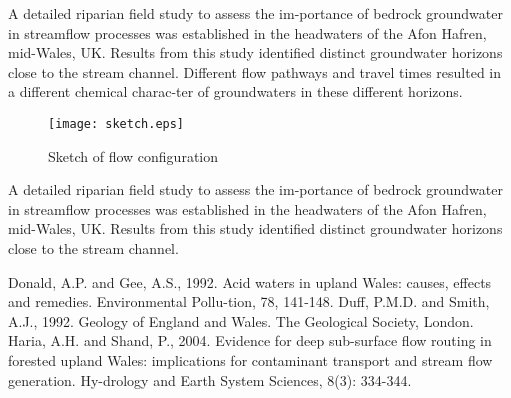 \documentclass[12pt,a4paper,twocolumn,fleqn]{narms}
\begin{document}
A detailed riparian field study to assess the im-portance of
bedrock groundwater in streamflow processes was established in the
headwaters of the Afon Hafren, mid-Wales, UK.  Results from this
study identified distinct groundwater horizons close to the stream
channel.  Different flow pathways and travel times resulted in a
different chemical charac-ter of groundwaters in these different
horizons.


\begin{figure}
\centerline{
\texttt{[image: sketch.eps]}
} \caption{Sketch of flow configuration} \label{f:sketch1}
\end{figure}


A detailed riparian field study to assess the im-portance of
bedrock groundwater in streamflow processes was established in the
headwaters of the Afon Hafren, mid-Wales, UK.  Results from this
study identified distinct groundwater horizons close to the stream
channel.

\begin{table}
\caption{Margin settings for A4 size paper and letter size paper.}
\end{table}


\begin{thebibliography}{9}
\bibitem{} Donald, A.P. and Gee, A.S., 1992.  Acid waters in upland Wales: causes, effects and remedies. Environmental Pollu-tion, 78, 141-148.
\bibitem{} Duff, P.M.D. and Smith, A.J., 1992. Geology of England and Wales.
The Geological Society, London.
\bibitem{} Haria, A.H. and Shand, P., 2004. Evidence for deep sub-surface flow routing in forested upland Wales: implications for contaminant transport and stream flow generation. Hy-drology and Earth System Sciences, 8(3): 334-344.
\end{thebibliography}
\end{document}
